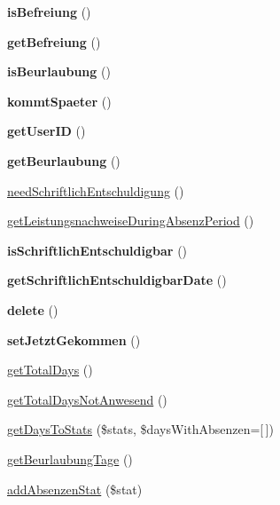 \begin{DoxyCompactItemize}
{\bfseries is\+Befreiung} ()
\item 
\mbox{\label{class_absenz_a39664965fe6a6f33a548cd8fa4a57734}} 
{\bfseries get\+Befreiung} ()
\item 
\mbox{\label{class_absenz_a97e516454c2f065eaa73dae0ea51bfe6}} 
{\bfseries is\+Beurlaubung} ()
\item 
\mbox{\label{class_absenz_a9ef53af3db13a0686a0fca8812a6105f}} 
{\bfseries kommt\+Spaeter} ()
\item 
\mbox{\label{class_absenz_a422c2a805984e05d36e86c8606820b0b}} 
{\bfseries get\+User\+ID} ()
\item 
\mbox{\label{class_absenz_a42c5e3df27bba5e043cd6c9747e3d676}} 
{\bfseries get\+Beurlaubung} ()
\item 
\mbox{\hyperlink{class_absenz_aaadea2d4bccd3d3fdfcaf1e1d23687a8}{need\+Schriftlich\+Entschuldigung}} ()
\item 
\mbox{\hyperlink{class_absenz_adaf39e6382e9a347ea2424c98eeda828}{get\+Leistungsnachweise\+During\+Absenz\+Period}} ()
\item 
\mbox{\label{class_absenz_aee845dcfb5509ff5490839b9ead36d97}} 
{\bfseries is\+Schriftlich\+Entschuldigbar} ()
\item 
\mbox{\label{class_absenz_aa227fb1f5f3718340e1428f895af0105}} 
{\bfseries get\+Schriftlich\+Entschuldigbar\+Date} ()
\item 
\mbox{\label{class_absenz_a7cfe7abfc1ae34a7847e322759bbbe0e}} 
{\bfseries delete} ()
\item 
\mbox{\label{class_absenz_aba36d2028e116680a5e8d884e0f42316}} 
{\bfseries set\+Jetzt\+Gekommen} ()
\item 
\mbox{\hyperlink{class_absenz_a1dbf5afdb32a6e1b7450cd71997c37ea}{get\+Total\+Days}} ()
\item 
\mbox{\hyperlink{class_absenz_a9030257dc4b61f6a08cf2590d030cfce}{get\+Total\+Days\+Not\+Anwesend}} ()
\item 
\mbox{\hyperlink{class_absenz_add0f9bd99894d733db7777290a3ade7a}{get\+Days\+To\+Stats}} (\$stats, \$days\+With\+Absenzen=\mbox{[}$\,$\mbox{]})
\item 
\mbox{\hyperlink{class_absenz_a9ffcc8544b8cebbe9256a9d848497c61}{get\+Beurlaubung\+Tage}} ()
\item 
\mbox{\hyperlink{class_absenz_aa0c15976f31b48577c02820115d25488}{add\+Absenzen\+Stat}} (\$stat)
\end{DoxyCompactItemize}
